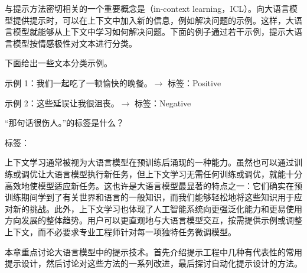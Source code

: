 与提示方法密切相关的一个重要概念是（in-context learning，ICL）。向大语言模型提供提示时，可以在上下文中加入新的信息，例如解决问题的示例。这样，大语言模型就能够从上下文中学习如何解决问题。下面的例子通过若干示例，提示大语言模型按情感极性对文本进行分类。

\vspace{0.5em}
\begin{tcolorbox}
\hspace{2em} 下面给出一些文本分类示例。

\vspace{0.3em}

\hspace{2em} 示例 1：我们一起吃了一顿愉快的晚餐。$\to$ 标签：Positive

\vspace{0.2em}

\hspace{2em} 示例 2：这些延误让我很沮丧。$\to$ 标签：Negative

\vspace{0.3em}

\hspace{2em} “那句话很伤人。”的标签是什么？

\vspace{0.2em}

\hspace{2em} 标签：\underline{\hspace{2em}}
\end{tcolorbox}
\vspace{0.5em}

上下文学习通常被视为大语言模型在预训练后涌现的一种能力。虽然也可以通过训练或调优让大语言模型执行新任务，但上下文学习无需任何训练或调优，就能十分高效地使模型适应新任务。这也许是大语言模型最显著的特点之一：它们确实在预训练期间学到了有关世界和语言的一般知识，而我们能够轻松地将这些知识用于应对新的挑战。此外，上下文学习也体现了人工智能系统向更强泛化能力和更易使用方向发展的整体趋势。用户可以更直观地与大语言模型交互，按需提供示例或调整上下文，而不必要求专业工程师针对每一项独特任务微调模型。

本章重点讨论大语言模型中的提示技术。首先介绍提示工程中几种有代表性的常用提示设计，然后讨论对这些方法的一系列改进，最后探讨自动化提示设计的方法。

\vspace{0.5em}



